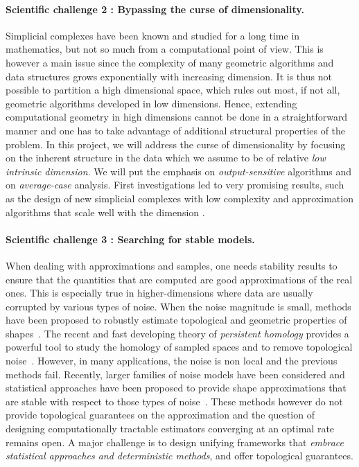 \paragraph{Scientific challenge 2 :  Bypassing the curse of dimensionality.} 
Simplicial complexes have been known and studied for a long time in mathematics, but not so much from a computational point of view. This is however a main issue since the complexity of many geometric algorithms and data structures grows exponentially with increasing dimension. It is thus not possible to partition a high dimensional space, which rules out most, if not all, geometric algorithms developed in low dimensions.
Hence, extending computational geometry in high dimensions cannot be done in a straightforward manner and one has to take advantage of additional structural properties of the problem. %
In this project, we will address the curse of dimensionality by focusing on the inherent structure in the data which we assume to be of relative {\em low intrinsic dimension}.  We will put the emphasis on {\em output-sensitive} algorithms and on {\em average-case} analysis.  First investigations led to very promising results, such as the design of new simplicial complexes with low complexity and approximation algorithms that scale well with the dimension \cite{geometrica-7142i}.
\vspace{-1mm}

\paragraph{Scientific challenge 3 : Searching for stable models.} 
When dealing with approximations and samples, one needs stability results to ensure that the quantities that are computed are good approximations of the real ones. This is especially true in higher-dimensions where data are usually corrupted by various types of noise.  When the noise magnitude is small, methods have been proposed to robustly estimate topological and geometric properties of shapes~\cite{nsw-tvu-2011}.  The recent and fast developing theory of {\em persistent homology} provides a powerful tool to study  the homology of sampled spaces and to remove topological noise~\cite{eh-ph-2008}.
However, in  many applications, the noise is non local and the previous methods fail.
Recently,  larger families of noise models  have been considered and statistical approaches  have been proposed to provide shape approximations that are stable with respect to   those types of noise~\cite{gpvw-mme-2011}. These methods however do not provide topological guarantees on the approximation and the question of designing computationally tractable estimators converging at an optimal rate remains open. A major challenge is to design  unifying frameworks that {\em embrace statistical approaches and deterministic methods}, and offer topological guarantees.   

